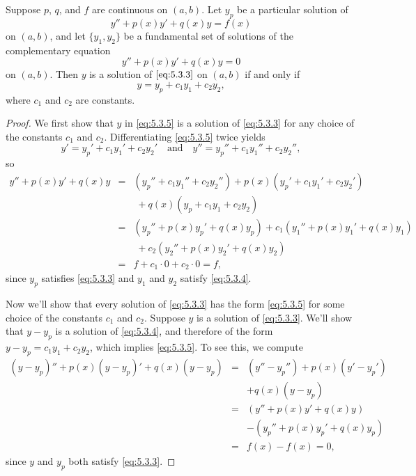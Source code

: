 \documentclass{ximera}
\begin{document}
\begin{theorem}\label{thmtype:5.3.2}
Suppose $p$, $q$, and $f$ are continuous on $(a,b)$. Let $y_p$
be a particular solution of
\begin{equation} \label{eq:5.3.3}
y''+p(x)y'+q(x)y=f(x)
\end{equation}
on $(a,b)$, and let  $\{y_1,y_2\}$ be a fundamental set of solutions
of the complementary equation
\begin{equation} \label{eq:5.3.4}
y''+p(x)y'+q(x)y=0
\end{equation}
on $(a,b)$.
Then $y$ is a solution of  $\eqref{eq:5.3.3}$ on $(a,b)$ if and  only if
\begin{equation} \label{eq:5.3.5}
y=y_p+c_1y_1+c_2y_2,
\end{equation}
where $c_1$ and $c_2$  are constants.
\end{theorem}

\begin{proof} We first show that $y$ in \eqref{eq:5.3.5} is a solution of
\eqref{eq:5.3.3} for any choice of the constants $c_1$ and $c_2$.
Differentiating \eqref{eq:5.3.5} twice yields
$$
y'=y_p'+c_1y_1'+c_2y_2'\quad\mbox{and}\quad
y''=y_p''+ c_1y_1''+c_2y_2'',
$$
so
\begin{eqnarray*}
y''+p(x)y'+q(x)y&=&(y_p''+c_1y_1''+c_2y_2'')
+p(x)(y_p'+c_1y_1'+c_2y_2')\\&&\; +q(x)(y_p+c_1y_1+c_2y_2)\\
&=&(y_p''+p(x)y_p'+q(x)y_p)+c_1(y_1''+p(x)y_1'+q(x)y_1)\\
&&\; +c_2(y_2''+p(x)y_2'+q(x)y_2)\\
&=& f+c_1\cdot0+c_2\cdot 0=f,
\end{eqnarray*}
since $y_p$ satisfies \eqref{eq:5.3.3} and $y_1$ and $y_2$ satisfy
\eqref{eq:5.3.4}.

Now we'll show that every solution of \eqref{eq:5.3.3} has the form
\eqref{eq:5.3.5} for some choice of the constants $c_1$ and  $c_2$.
Suppose $y$ is a solution of \eqref{eq:5.3.3}. We'll show that
$y-y_p$ is a solution of \eqref{eq:5.3.4}, and therefore of the form
$y-y_p=c_1y_1+c_2y_2$, which implies \eqref{eq:5.3.5}. To see this, we
compute
\begin{eqnarray*}
(y-y_p)''+p(x)(y-y_p)'+q(x)(y-y_p)&=&(y''-y_p'')+p(x)(y'-y_p')\\ &&
+q(x)(y-y_p)\\
&=&(y''+p(x)y'+q(x)y)\\ && -(y_p''+p(x)y_p'+q(x)y_p)\\
&=&f(x)-f(x)=0,
\end{eqnarray*}
since $y$ and $y_p$ both satisfy \eqref{eq:5.3.3}. 
\end{proof}
\end{document}
